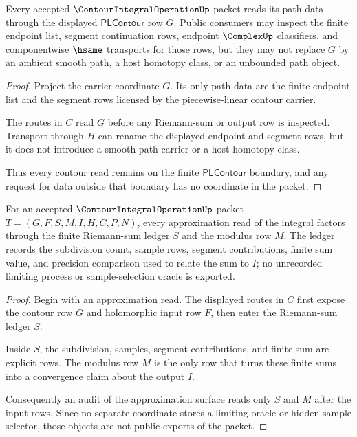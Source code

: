 \begin{theorem}
\label{thm:contour-integral-pl-contour-boundary}
Every accepted $\ContourIntegralOperationUp$ packet reads its path data through the displayed $\mathsf{PLContour}$ row $G$. Public consumers may inspect the finite endpoint list, segment continuation rows, endpoint $\ComplexUp$ classifiers, and componentwise $\hsame$ transports for those rows, but they may not replace $G$ by an ambient smooth path, a host homotopy class, or an unbounded path object.
\end{theorem}
\begin{proof}
Project the carrier coordinate $G$. Its only path data are the finite endpoint list and the segment rows licensed by the piecewise-linear contour carrier.

The routes in $C$ read $G$ before any Riemann-sum or output row is inspected. Transport through $H$ can rename the displayed endpoint and segment rows, but it does not introduce a smooth path carrier or a host homotopy class.

Thus every contour read remains on the finite $\mathsf{PLContour}$ boundary, and any request for data outside that boundary has no coordinate in the packet.
\end{proof}

\begin{theorem}
\label{thm:contour-integral-riemann-sum-ledger}
For an accepted $\ContourIntegralOperationUp$ packet $T=(G,F,S,M,I,H,C,P,N)$, every approximation read of the integral factors through the finite Riemann-sum ledger $S$ and the modulus row $M$. The ledger records the subdivision count, sample rows, segment contributions, finite sum value, and precision comparison used to relate the sum to $I$; no unrecorded limiting process or sample-selection oracle is exported.
\end{theorem}
\begin{proof}
Begin with an approximation read. The displayed routes in $C$ first expose the contour row $G$ and holomorphic input row $F$, then enter the Riemann-sum ledger $S$.

Inside $S$, the subdivision, samples, segment contributions, and finite sum are explicit rows. The modulus row $M$ is the only row that turns these finite sums into a convergence claim about the output $I$.

Consequently an audit of the approximation surface reads only $S$ and $M$ after the input rows. Since no separate coordinate stores a limiting oracle or hidden sample selector, those objects are not public exports of the packet.
\end{proof}

